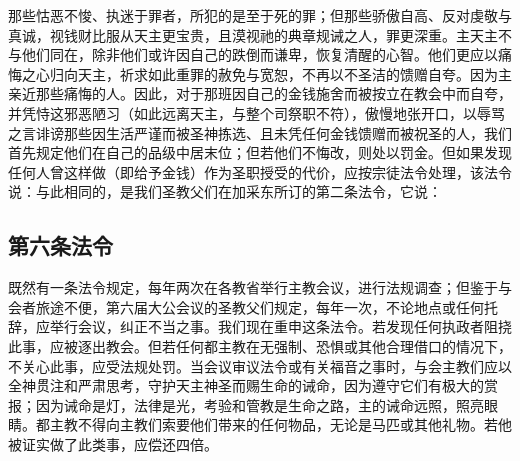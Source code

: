那些怙恶不悛、执迷于罪者，所犯的是至于死的罪；但那些骄傲自高、反对虔敬与真诚，视钱财比服从天主更宝贵，且漠视祂的典章规诫之人，罪更深重。主天主不与他们同在，除非他们或许因自己的跌倒而谦卑，恢复清醒的心智。他们更应以痛悔之心归向天主，祈求如此重罪的赦免与宽恕，不再以不圣洁的馈赠自夸。因为主亲近那些痛悔的人。因此，对于那班因自己的金钱施舍而被按立在教会中而自夸，并凭恃这邪恶陋习（如此远离天主，与整个司祭职不符），傲慢地张开口，以辱骂之言诽谤那些因生活严谨而被圣神拣选、且未凭任何金钱馈赠而被祝圣的人，我们首先规定他们在自己的品级中居末位；但若他们不悔改，则处以罚金。但如果发现任何人曾这样做（即给予金钱）作为圣职授受的代价，应按宗徒法令处理，该法令说：与此相同的，是我们圣教父们在加采东所订的第二条法令，它说：\par

\par


\subsection{第六条法令}

\par

既然有一条法令规定，每年两次在各教省举行主教会议，进行法规调查；但鉴于与会者旅途不便，第六届大公会议的圣教父们规定，每年一次，不论地点或任何托辞，应举行会议，纠正不当之事。我们现在重申这条法令。若发现任何执政者阻挠此事，应被逐出教会。但若任何都主教在无强制、恐惧或其他合理借口的情况下，不关心此事，应受法规处罚。当会议审议法令或有关福音之事时，与会主教们应以全神贯注和严肃思考，守护天主神圣而赐生命的诫命，因为遵守它们有极大的赏报；因为诫命是灯，法律是光，考验和管教是生命之路，主的诫命远照，照亮眼睛。都主教不得向主教们索要他们带来的任何物品，无论是马匹或其他礼物。若他被证实做了此类事，应偿还四倍。\par

